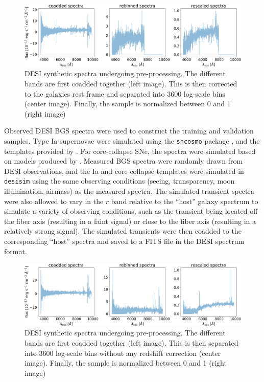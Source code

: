 \begin{figure}[t!]
    \centering
    \includegraphics[width=\textwidth]{figures/preprocess/3600_Zcorrected_spectra.png}
    \caption[Spectra Pre-Processing --  Redshift Corrected]{DESI synthetic spectra undergoing pre-processing. The different bands
    are first coadded together (left image). This is then  corrected to the galaxies rest frame and separated into 3600 
    log-scale bins (center image). Finally, the sample is normalized between 0 and 1 (right image)}
    \label{fig:spectra_preproc}
\end{figure} 
Observed DESI BGS spectra were used to construct the training and validation samples. 
Type Ia supernovae were simulated using the \texttt{sncosmo} package \parencite{sncosmo}, and the templates 
provided by \textcite{Hsiao2007}. For core-collapse SNe, the spectra were simulated based 
on models produced by \textcite{Vincenzi2019}. Measured BGS spectra were randomly drawn from DESI observations, and the Ia and core-collapse templates were simulated in {\tt desisim} using the same observing conditions (seeing, transparency, moon illumination, airmass) as the measured spectra. The simulated transient spectra were also allowed to vary in the $r$ band relative to the ``host'' galaxy spectrum to simulate a variety of observing conditions, such as the transient being located off the fiber axis (resulting in a faint signal) or close to the fiber axis (resulting in a relatively strong signal). The simulated transients were then coadded to the corresponding ``host'' spectra and saved to a FITS file in the DESI spectrum format.

\begin{figure}[b!]
    \centering
    \includegraphics[width=\textwidth]{figures/preprocess/3600_Zrestframe_spectra.png}
    \caption[Spectra Pre-Processing -- Not Redshift Corrected]{DESI synthetic spectra undergoing pre-processing. 
    The different bands are first coadded together (left image). This is then separated 
    into 3600 log-scale bins without any redshift correction (center image). Finally, 
    the sample is normalized between 0 and 1 (right image)}
    \label{fig:sepctra_preproc_nored}
\end{figure} 
